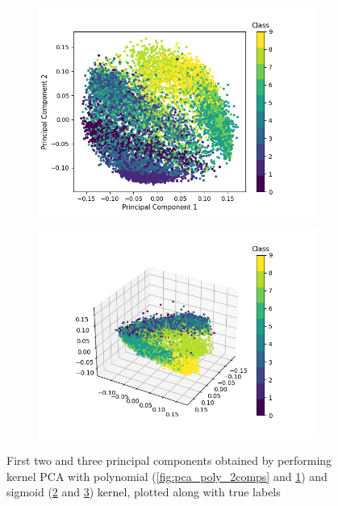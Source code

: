 \documentclass[12pt]{article}
\begin{document}
\begin{figure}[h]
\begin{subfigure}{0.5\textwidth}
		\caption{}
		\label{fig:pca_poly_3comps}
	\end{subfigure}
	\begin{subfigure}{0.5\textwidth}
		\includegraphics[width=0.4\textheight]{pca_sigmoid_2comps.png}
		\caption{}
		\label{fig:pca_sigmoid_2comps}
	\end{subfigure}
	\begin{subfigure}{0.5\textwidth}
		\includegraphics[width=0.4\textheight]{pca_sigmoid_3comps.png}
		\caption{}
		\label{fig:pca_sigmoid_3comps}
	\end{subfigure}
	\caption{First two and three principal components obtained by performing kernel PCA with polynomial (\ref{fig:pca_poly_2comps} and \ref{fig:pca_poly_3comps}) and sigmoid  (\ref{fig:pca_sigmoid_2comps} and \ref{fig:pca_sigmoid_3comps}) kernel, plotted along with true labels}
	\label{fig:pca_poly_sigmoid}
\end{figure}
\end{document}
